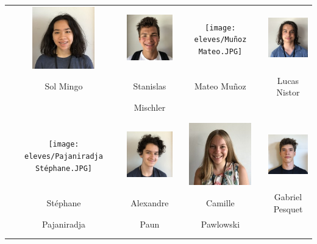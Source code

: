 \begin{center}
\begin{tabular}{cccc}
\includegraphics[angle=270,origin=c, width=27mm]{eleves/Mingo Sol.JPG} &
\includegraphics[angle=270,origin=c, width=27mm]{eleves/Mischler Stanislas.JPG} &
\texttt{[image: eleves/Muñoz Mateo.JPG]} &
\includegraphics[angle=270,origin=c, width=27mm]{eleves/Nistor Lucas.JPG} \\
Sol Mingo & Stanislas & Mateo Muñoz & Lucas Nistor \\ & Mischler & & \\ \\ \\ 

\texttt{[image: eleves/Pajaniradja Stéphane.JPG]} &
\includegraphics[angle=270,origin=c, width=27mm]{eleves/Paun Alexandre.JPG} &
\includegraphics[angle=270,origin=c, width=27mm]{eleves/Pawlowski Camille.JPG} &
\includegraphics[angle=270,origin=c, width=27mm]{eleves/Pesquet Gabriel.JPG} \\
Stéphane & Alexandre & Camille & Gabriel Pesquet \\ Pajaniradja & Paun & Pawlowski & \\ \\ \\ 


\end{tabular}
\end{center}
